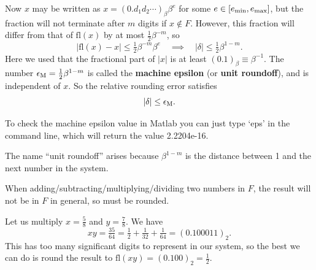 \documentclass[
  letterpaper,
  DIV=11,
  numbers=noendperiod]{scrreprt}
\begin{document}
Now \(x\) may be written as \(x=(0.d_1d_2\cdots)_\beta\beta^e\) for some
\(e\in[e_{\rm min},e_{\rm max}]\), but the fraction will not terminate
after \(m\) digits if \(x\notin F\). However, this fraction will differ
from that of \(\mathrm{fl}(x)\) by at most \(\tfrac12\beta^{-m}\), so \[
|\mathrm{fl}(x) - x| \leq \tfrac12\beta^{-m}\beta^e \quad \implies \quad |\delta| \leq \tfrac12\beta^{1-m}.
\] Here we used that the fractional part of \(|x|\) is at least
\((0.1)_\beta \equiv \beta^{-1}\). The number
\(\epsilon_{\rm M} = \tfrac12\beta^{1-m}\) is called the \textbf{machine
epsilon} (or \textbf{unit roundoff}), and is independent of \(x\). So
the relative rounding error satisfies \[
|\delta| \leq \epsilon_{\rm M}.
\]

\begin{tcolorbox}[enhanced jigsaw, bottomrule=.15mm, colbacktitle=quarto-callout-note-color!10!white, breakable, arc=.35mm, coltitle=black, colback=white, bottomtitle=1mm, opacityback=0, title=\textcolor{quarto-callout-note-color}{\faInfo}\hspace{0.5em}{Note}, titlerule=0mm, toptitle=1mm, opacitybacktitle=0.6, colframe=quarto-callout-note-color-frame, leftrule=.75mm, rightrule=.15mm, left=2mm, toprule=.15mm]

To check the machine epsilon value in Matlab you can just type `eps' in
the command line, which will return the value 2.2204e-16.

\end{tcolorbox}

\begin{tcolorbox}[enhanced jigsaw, bottomrule=.15mm, colbacktitle=quarto-callout-note-color!10!white, breakable, arc=.35mm, coltitle=black, colback=white, bottomtitle=1mm, opacityback=0, title=\textcolor{quarto-callout-note-color}{\faInfo}\hspace{0.5em}{Note}, titlerule=0mm, toptitle=1mm, opacitybacktitle=0.6, colframe=quarto-callout-note-color-frame, leftrule=.75mm, rightrule=.15mm, left=2mm, toprule=.15mm]

The name ``unit roundoff'' arises because \(\beta^{1-m}\) is the
distance between 1 and the next number in the system.

\end{tcolorbox}

When adding/subtracting/multiplying/dividing two numbers in \(F\), the
result will not be in \(F\) in general, so must be rounded.

Let us multiply \(x=\tfrac58\) and \(y=\tfrac78\). We have \[
xy = \tfrac{35}{64} = \tfrac12 + \tfrac1{32} + \tfrac1{64} = (0.100011)_2.
\] This has too many significant digits to represent in our system, so
the best we can do is round the result to
\(\mathrm{fl}(xy) = (0.100)_2 = \tfrac12\).
\end{document}

